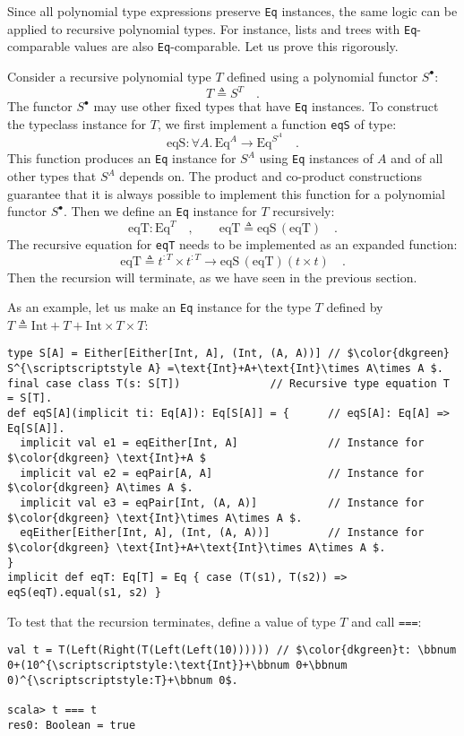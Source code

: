 Since all polynomial type expressions preserve \lstinline!Eq! instances,
the same logic can be applied to recursive polynomial types. For instance,
lists and trees with \lstinline!Eq!-comparable values are also \lstinline!Eq!-comparable.
Let us prove this rigorously.

Consider a recursive polynomial type $T$ defined using a polynomial
functor $S^{\bullet}$:
\[
T\triangleq S^{T}\quad.
\]
The functor $S^{\bullet}$ may use other fixed types that have \lstinline!Eq!
instances. To construct the typeclass instance for $T$, we first
implement a function \lstinline!eqS! of type:
\[
\text{eqS}:\forall A.\,\text{Eq}^{A}\rightarrow\text{Eq}^{S^{A}}\quad.
\]
This function produces an \lstinline!Eq! instance for $S^{A}$ using
\lstinline!Eq! instances of $A$ and of all other types that $S^{A}$
depends on. The product and co-product constructions guarantee that
it is always possible to implement this function for a polynomial
functor $S^{\bullet}$. Then we define an \lstinline!Eq! instance
for $T$ recursively:
\[
\text{eqT}:\text{Eq}^{T}\quad,\quad\quad\text{eqT}\triangleq\text{eqS}\,(\text{eqT})\quad.
\]
The recursive equation for \lstinline!eqT! needs to be implemented
as an expanded function:
\[
\text{eqT}\triangleq t^{:T}\times t^{:T}\rightarrow\text{eqS}\,(\text{eqT})\left(t\times t\right)\quad.
\]
Then the recursion will terminate, as we have seen in the previous
section.

As an example, let us make an \lstinline!Eq! instance for the type
$T$ defined by $T\triangleq\text{Int}+T+\text{Int}\times T\times T$:
\begin{lstlisting}[mathescape=true]
type S[A] = Either[Either[Int, A], (Int, (A, A))] // $\color{dkgreen} S^{\scriptscriptstyle A} =\text{Int}+A+\text{Int}\times A\times A $.
final case class T(s: S[T])              // Recursive type equation T = S[T].
def eqS[A](implicit ti: Eq[A]): Eq[S[A]] = {      // eqS[A]: Eq[A] => Eq[S[A]].
  implicit val e1 = eqEither[Int, A]              // Instance for $\color{dkgreen} \text{Int}+A $
  implicit val e2 = eqPair[A, A]                  // Instance for $\color{dkgreen} A\times A $.
  implicit val e3 = eqPair[Int, (A, A)]           // Instance for $\color{dkgreen} \text{Int}\times A\times A $.
  eqEither[Either[Int, A], (Int, (A, A))]         // Instance for $\color{dkgreen} \text{Int}+A+\text{Int}\times A\times A $.
}
implicit def eqT: Eq[T] = Eq { case (T(s1), T(s2)) => eqS(eqT).equal(s1, s2) }
\end{lstlisting}
To test that the recursion terminates, define a value of type $T$
and call \lstinline!===!:
\begin{lstlisting}[mathescape=true]
val t = T(Left(Right(T(Left(Left(10)))))) // $\color{dkgreen}t: \bbnum 0+(10^{\scriptscriptstyle:\text{Int}}+\bbnum 0+\bbnum 0)^{\scriptscriptstyle:T}+\bbnum 0$.

scala> t === t
res0: Boolean = true
\end{lstlisting}


